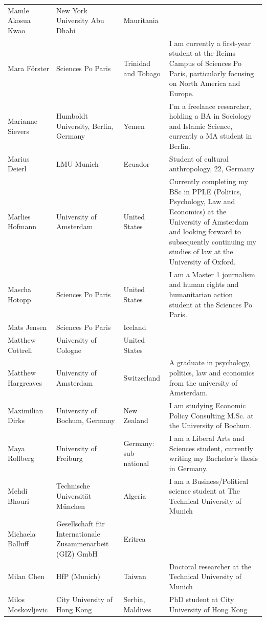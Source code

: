 \documentclass[]{article}
\begin{document}
\begin{longtable}{l>{\raggedright\arraybackslash}p{2cm}>{\raggedright\arraybackslash}p{2cm}>{\raggedright\arraybackslash}p{3cm}}
\rowcolor{gray!6}  Mamle Akosua Kwao & New York University Abu Dhabi & Mauritania & \\
Mara Förster & Sciences Po Paris & Trinidad and Tobago & I am currently a first-year student at the Reims Campus of Sciences Po Paris, particularly focusing on North America and Europe.\\
\rowcolor{gray!6}  Marianne Sievers & Humboldt University, Berlin, Germany & Yemen & I'm a freelance researcher, holding a BA in Sociology and Islamic Science, currently a MA student in Berlin.\\
Marius Deierl & LMU Munich & Ecuador & Student of cultural anthropology, 22, Germany\\
\rowcolor{gray!6}  Marlies Hofmann & University of Amsterdam & United States & Currently completing my BSc in PPLE (Politics, Psychology, Law and Economics) at the University of Amsterdam and looking forward to subsequently continuing my studies of law at the University of Oxford.\\
\addlinespace
Mascha Hotopp & Sciences Po Paris & United States & I am a Master 1 journalism and human rights and humanitarian action student at the Sciences Po Paris.\\
\rowcolor{gray!6}  Mats Jensen & Sciences Po Paris & Iceland & \\
Matthew Cottrell & University of Cologne & United States & \\
\rowcolor{gray!6}  Matthew Hargreaves & University of Amsterdam & Switzerland & A graduate in psychology, politics, law and economics from the university of Amsterdam.\\
Maximilian Dirks & University of Bochum, Germany & New Zealand & I am studying Economic Policy Consulting M.Sc. at the University of Bochum.\\
\addlinespace
\rowcolor{gray!6}  Maya Rollberg & University of Freiburg & Germany: sub-national & I am a Liberal Arts and Sciences student, currently writing my Bachelor's thesis in Germany.\\
Mehdi Bhouri & Technische Universität München & Algeria & I am a Business/Political science student at The Technical University of Munich\\
\rowcolor{gray!6}  Michaela Balluff & Gesellschaft für Internationale Zusammenarbeit (GIZ) GmbH & Eritrea & \\
Milan Chen & HfP (Munich) & Taiwan & Doctoral researcher at the Technical University of Munich\\
\rowcolor{gray!6}  Milos Moskovljevic & City University of Hong Kong & Serbia, Maldives & PhD student at City University of Hong Kong\\

\end{longtable}
\end{document}
